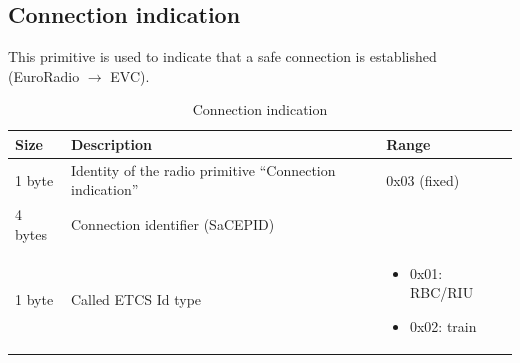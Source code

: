 \documentclass[nocc]{template/openetcs_report}
\begin{document}
\subsection{Connection indication}
This primitive is used to indicate that a safe connection is established (EuroRadio $\rightarrow$ EVC).
			\begin{longtable}{|l|l|l|}
				\caption{Connection indication}\\ 
				\hline
				
					\begin{minipage}[t]{0.1\linewidth} \textbf{Size}	\end{minipage}
				&	\begin{minipage}[t]{0.5\linewidth} \textbf{Description}	\end{minipage}
				&	\begin{minipage}[t]{0.3\linewidth} \textbf{Range} \end{minipage} \\
				
				\hline
					 \begin{minipage}[t]{0.1\linewidth}1 byte \end{minipage}
					&\begin{minipage}[t]{0.6\linewidth}Identity of the radio primitive "`Connection indication"'	\end{minipage}
					&\begin{minipage}[t]{0.3\linewidth}0x03 (fixed) \end{minipage} \\
					
				\hline
					 \begin{minipage}[t]{0.1\linewidth}4 bytes \end{minipage}
					&\begin{minipage}[t]{0.6\linewidth}Connection identifier (SaCEPID)	\end{minipage}
					&\begin{minipage}[t]{0.3\linewidth}\end{minipage} \\
					
				\hline
					 \begin{minipage}[t]{0.1\linewidth}1 byte \end{minipage}
					&\begin{minipage}[t]{0.6\linewidth}Called ETCS Id type\end{minipage}
					&\begin{minipage}[t]{0.3\linewidth}
						\begin{itemize}
							\item 0x01: RBC/RIU
							\item 0x02: train
						\end{itemize}
					\end{minipage} \\
					

\end{longtable}
\end{document}
